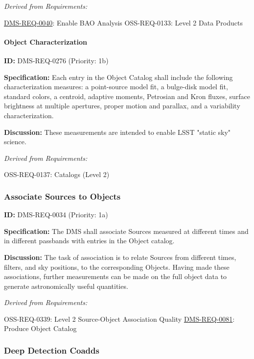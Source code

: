 \documentclass[SE,toc,lsstdraft]{lsstdoc}
\begin{document}
\emph{Derived from Requirements:}

\hyperref[DMS-REQ-0040]{DMS-REQ-0040}:
Enable BAO Analysis \newline
OSS-REQ-0133:
Level 2 Data Products \newline

\paragraph{Object Characterization}\hfill  %

\label{DMS-REQ-0276}
\textbf{ID:} DMS-REQ-0276 (Priority: 1b)

\textbf{Specification:} Each entry in the Object Catalog shall include the following characterization measures: a point-source model fit, a bulge-disk model fit, standard colors, a centroid, adaptive moments, Petrosian and Kron fluxes, surface brightness at multiple apertures, proper motion and parallax, and a variability characterization.

\textbf{Discussion: }These measurements are intended to enable LSST "static sky" science.

\emph{Derived from Requirements:}

OSS-REQ-0137:
Catalogs (Level 2) \newline

\subsubsection{Associate Sources to Objects}

\label{DMS-REQ-0034}
\textbf{ID:} DMS-REQ-0034 (Priority: 1a)

\textbf{Specification:} The DMS shall associate Sources measured at different times and in different passbands with entries in the Object catalog.

\textbf{Discussion:} The task of association is to relate Sources from different times, filters, and sky positions, to the corresponding Objects. Having made these associations, further measurements can be made on the full object data to generate astronomically useful quantities.

\emph{Derived from Requirements:}

OSS-REQ-0339:
Level 2 Source-Object Association Quality \newline
\hyperref[DMS-REQ-0081]{DMS-REQ-0081}:
Produce Object Catalog \newline

\subsubsection{Deep Detection Coadds}
\end{document}
